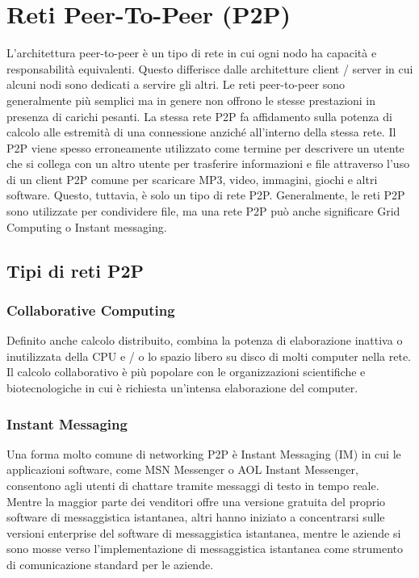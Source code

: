 \section{Reti Peer-To-Peer (P2P)}
L'architettura peer-to-peer è un tipo di rete in cui ogni nodo ha capacità e
responsabilità equivalenti. Questo differisce dalle architetture client /
server in cui alcuni nodi sono dedicati a servire gli altri. Le reti
peer-to-peer sono generalmente più semplici ma in genere non offrono le stesse
prestazioni in presenza di carichi pesanti. La stessa rete P2P fa affidamento
sulla potenza di calcolo alle estremità di una connessione anziché all'interno
della stessa rete.
Il P2P viene spesso erroneamente utilizzato come termine per descrivere un
utente che si collega con un altro utente per trasferire informazioni e file
attraverso l'uso di un client P2P comune per scaricare MP3, video, immagini,
giochi e altri software. Questo, tuttavia, è solo un tipo di rete P2P.
Generalmente, le reti P2P sono utilizzate per condividere file, ma una rete P2P
può anche significare Grid Computing o Instant messaging.

\subsection{Tipi di reti P2P}
\subsubsection{Collaborative Computing}
Definito anche calcolo distribuito, combina la potenza di elaborazione inattiva
o inutilizzata della CPU e / o lo spazio libero su disco di molti computer
nella rete. Il calcolo collaborativo è più popolare con le organizzazioni
scientifiche e biotecnologiche in cui è richiesta un'intensa elaborazione del
computer.
\subsubsection{Instant Messaging}
Una forma molto comune di networking P2P è Instant Messaging (IM) in cui le
applicazioni software, come MSN Messenger o AOL Instant Messenger,
consentono agli utenti di chattare tramite messaggi di testo in tempo reale.
Mentre la maggior parte dei venditori offre una versione gratuita del proprio
software di messaggistica istantanea, altri hanno iniziato a concentrarsi sulle
versioni enterprise del software di messaggistica istantanea, mentre le aziende
si sono mosse verso l'implementazione di messaggistica istantanea come
strumento di comunicazione standard per le aziende.

